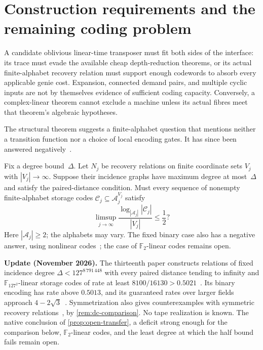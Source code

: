 \section{Construction requirements and the remaining coding problem}\label{sec:open}

A candidate oblivious linear-time transposer must fit both sides of the interface: its trace must evade the available cheap depth-reduction theorems, or its actual finite-alphabet recovery relation must support enough codewords to absorb every applicable genie cost. Expansion, connected demand pairs, and multiple cyclic inputs are not by themselves evidence of sufficient coding capacity. Conversely, a complex-linear theorem cannot exclude a machine unless its actual fibres meet that theorem's algebraic hypotheses.

The structural theorem suggests a finite-alphabet question that mentions neither a transition function nor a choice of local encoding gates. It has since been answered negatively~\cite{StorageCodes2026}.

\begin{question}\label{prob:open-paired}
Fix a degree bound~$\Delta$. Let $N_j$ be recovery relations on finite coordinate sets $V_j$ with $|V_j|\to\infty$. Suppose their incidence graphs have maximum degree at most~$\Delta$ and satisfy the paired-distance condition. Must every sequence of nonempty finite-alphabet storage codes $\mathcal C_j\subseteq\mathcal A_j^{V_j}$ satisfy
\[
 \limsup_{j\to\infty}\frac{\log_{|\mathcal A_j|}|\mathcal C_j|}{|V_j|}\le\frac12?
\]
Here $|\mathcal A_j|\ge2$; the alphabets may vary. The fixed binary case also has a negative answer, using nonlinear codes~\cite[Corollary~A$'$]{StorageCodes2026}; the case of $\mathbb F_2$-linear codes remains open.
\end{question}

\textbf{Update (November 2026).} The thirteenth paper constructs relations of fixed incidence degree $\Delta<127^{8\,791\,448}$ with every paired distance tending to infinity and $\mathbb F_{127^2}$-linear storage codes of rate at least $8100/16130>0.5021$~\cite[Theorem~A]{StorageCodes2026}. Its binary encoding has rate above $0.5013$, and its guaranteed rates over larger fields approach $4-2\sqrt3$~\cite[Corollary~A$'$ and Theorem~A$^*$]{StorageCodes2026}. Symmetrization also gives counterexamples with symmetric recovery relations~\cite[Corollary~U]{StorageCodes2026}, by \cref{rem:dc-comparison}. No tape realization is known. The native conclusion of \cref{prop:open-transfer}, a deficit strong enough for the comparison below, $\mathbb F_2$-linear codes, and the least degree at which the half bound fails remain open.

